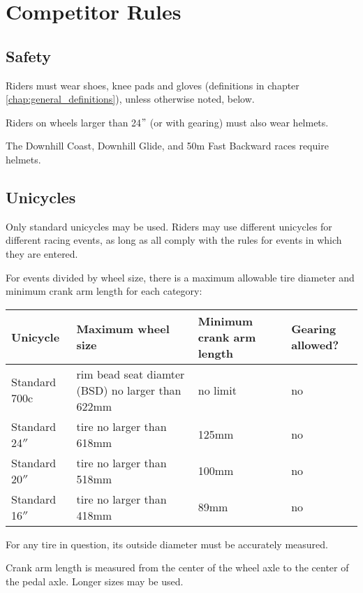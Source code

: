 \chapter{Competitor Rules}

\section{Safety}

Riders must wear shoes, knee pads and gloves (definitions in chapter \ref{chap:general_definitions}), unless otherwise noted, below.

Riders on wheels larger than 24$"$ (or with gearing) must also wear helmets.

The Downhill Coast, Downhill Glide, and 50m Fast Backward races require helmets.

\section{Unicycles}

Only standard unicycles may be used.
Riders may use different unicycles for different racing events, as long as all comply with the rules for events in which they are entered.

For events divided by wheel size, there is a maximum allowable tire diameter and minimum crank arm length for each category:

\begin{longtable}{|p{3cm}|p{5cm}|p{2cm}|p{2cm}|}
\hline
\textbf{Unicycle} & \textbf{Maximum wheel size} & \textbf{Minimum crank arm length} & \textbf{Gearing allowed?}\\
\hline
Standard 700c & rim bead seat diamter (BSD) 
no larger than 622mm & no limit & no \\
\hline
Standard 24$''$ & tire no larger than 618mm & 125mm & no \\
\hline
Standard 20$''$ & tire no larger than 518mm & 100mm & no \\
\hline
Standard 16$''$ & tire no larger than 418mm & 89mm & no \\
\hline
\end{longtable}

For any tire in question, its outside diameter must be accurately measured.

Crank arm length is measured from the center of the wheel axle to the center of the pedal axle. Longer sizes may be used.

